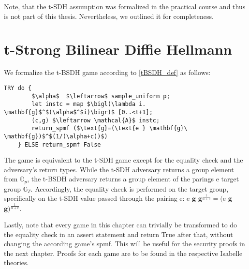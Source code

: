 Note, that the t-SDH assumption was formalized in the practical course and thus is not part of this thesis. Nevertheless, we outlined it for completeness. 

\section*{t-Strong Bilinear Diffie Hellmann}
We formalize the t-BSDH game according to \ref{tBSDH_def} as follows: 
\begin{lstlisting}[language=isabelle]
    TRY do {
        $\alpha$  $\leftarrow$ sample_uniform p;
        let instc = map $\bigl(\lambda i. \mathbf{g}$^$(\alpha$^$i)\bigr)$ [0..<t+1];
        (c,g) $\leftarrow \mathcal{A}$ instc;
        return_spmf ($\text{g}=(\text{e } \mathbf{g}\ \mathbf{g})$^$(1/(\alpha+c))$)
    } ELSE return_spmf False
\end{lstlisting}
The game is equivalent to the t-SDH game except for the equality check and the adversary's return types. 
While the t-SDH adversary returns a group element from $\mathbb{G}_p$, the t-BSDH adversary returns a group element of the parings e target group $\mathbb{G}_T$. Accordingly, the equality check is performed on the target group, specifically on the t-SDH value passed through the pairing e: e $\mathbf{g}$ $\mathbf{g}^{\frac{1}{\alpha+c}} = \text{(e}$ $\mathbf{g}$ $\mathbf{g})^{\frac{1}{\alpha+c}}$.

Lastly, note that every game in this chapter can trivially be transformed to do the equality check in an assert statement and return True after that, without changing the according game's spmf. This will be useful for the security proofs in the next chapter. Proofs for each game are to be found in the respective Isabelle theories.